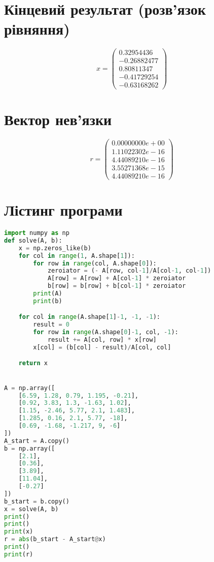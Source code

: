 \documentclass{article}
\begin{document}
    \section{Кінцевий результат (розв’язок рівняння)}
$$ x = 
\left( \begin{matrix}
    0.32954436\\
    -0.26882477\\
    0.80811347\\
    -0.41729254\\
    -0.63168262
\end{matrix}\right)
$$
    \section{Вектор нев’язки}
$$ r = 
\left( \begin{matrix}
    0.00000000e+00\\
    1.11022302e-16\\
    4.44089210e-16\\
    3.55271368e-15\\
    4.44089210e-16
\end{matrix}\right)
$$

    \section{Лістинг програми}
    \begin{lstlisting}[language=Python, caption=SLAR]
import numpy as np
def solve(A, b):
    x = np.zeros_like(b)
    for col in range(1, A.shape[1]):
        for row in range(col, A.shape[0]):
            zeroiator = (- A[row, col-1]/A[col-1, col-1])
            A[row] = A[row] + A[col-1] * zeroiator
            b[row] = b[row] + b[col-1] * zeroiator
        print(A)
        print(b)

    for col in range(A.shape[1]-1, -1, -1):
        result = 0
        for row in range(A.shape[0]-1, col, -1):
            result += A[col, row] * x[row]
        x[col] = (b[col] - result)/A[col, col]

    return x


A = np.array([
    [6.59, 1.28, 0.79, 1.195, -0.21],
    [0.92, 3.83, 1.3, -1.63, 1.02],
    [1.15, -2.46, 5.77, 2.1, 1.483],
    [1.285, 0.16, 2.1, 5.77, -18],
    [0.69, -1.68, -1.217, 9, -6]
])
A_start = A.copy()
b = np.array([
    [2.1],
    [0.36],
    [3.89],
    [11.04],
    [-0.27]
])
b_start = b.copy()
x = solve(A, b)
print()
print()
print(x)
r = abs(b_start - A_start@x)
print()
print(r)
    \end{lstlisting}
\end{document}
